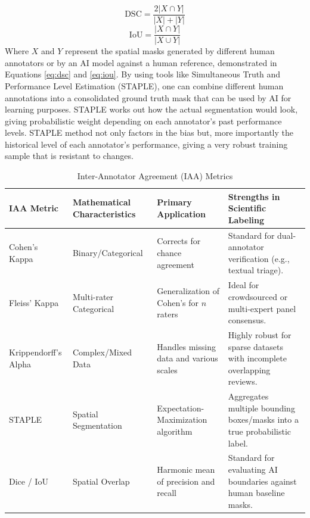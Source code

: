 \documentclass[10pt, conference, letterpaper]{IEEEtran}
\begin{document}
\begin{equation}
\text{DSC} = \frac{2|X \cap Y|}{|X| + |Y|}
\label{eq:dsc}
\end{equation}
\begin{equation}
\text{IoU} = \frac{|X \cap Y|}{|X \cup Y|}
\label{eq:iou}
\end{equation}
Where $X$ and $Y$ represent the spatial masks generated by different human annotators or by an AI model against a human reference, demonstrated in Equations \eqref{eq:dsc} and \eqref{eq:iou}. By using tools like Simultaneous Truth and Performance Level Estimation (STAPLE), one can combine different human annotations into a consolidated ground truth mask that can be used by AI for learning purposes. STAPLE works out how the actual segmentation would look, giving probabilistic weight depending on each annotator's past performance levels.
STAPLE method not only factors in the bias but, more importantly
the historical level of each annotator's performance, giving a very robust training sample that is resistant to changes.

\begin{table}[!t]
\centering
\caption{Inter-Annotator Agreement (IAA) Metrics}
\label{tab:metrics}
\footnotesize
\renewcommand{\arraystretch}{1.25}
\begin{tabularx}{\textwidth}{@{} >{\raggedright\arraybackslash}p{} >{\raggedright\arraybackslash}X >{\raggedright\arraybackslash}X >{\raggedright\arraybackslash}X @{}}
\toprule
\textbf{IAA Metric} & \textbf{Mathematical Characteristics} & \textbf{Primary Application} & \textbf{Strengths in Scientific Labeling} \\
\midrule
Cohen's Kappa & Binary/Categorical & Corrects for chance agreement & Standard for dual-annotator verification (e.g., textual triage). \\
Fleiss' Kappa & Multi-rater Categorical & Generalization of Cohen's for $n$ raters & Ideal for crowdsourced or multi-expert panel consensus. \\
Krippendorff's Alpha & Complex/Mixed Data & Handles missing data and various scales & Highly robust for sparse datasets with incomplete overlapping reviews. \\
STAPLE & Spatial Segmentation & Expectation-Maximization algorithm & Aggregates multiple bounding boxes/masks into a true probabilistic label. \\
Dice / IoU & Spatial Overlap & Harmonic mean of precision and recall & Standard for evaluating AI boundaries against human baseline masks. \\
\bottomrule
\end{tabularx}
\end{table}
\end{document}
